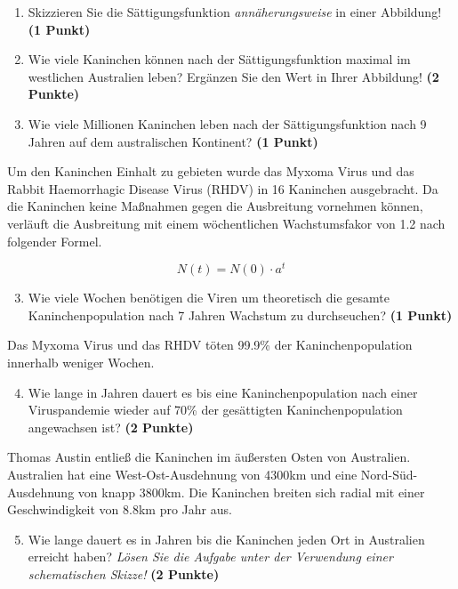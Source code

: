 \documentclass[a4paper, 9pt]{scrartcl}\usepackage[]{graphicx}\usepackage[]{xcolor}
\begin{document}
\begin{enumerate}
\item Skizzieren Sie die S{\"a}ttigungsfunktion \textit{ann{\"a}herungsweise} in einer Abbildung! \textbf{(1
    Punkt)}
\item Wie viele Kaninchen k{\"o}nnen nach der S{\"a}ttigungsfunktion maximal im
  westlichen Australien leben? Erg{\"a}nzen Sie den Wert in Ihrer Abbildung! \textbf{(2 Punkte)}
\item Wie viele Millionen Kaninchen leben nach der S{\"a}ttigungsfunktion
  nach 9 Jahren auf dem australischen Kontinent? \textbf{(1
    Punkt)}
\end{enumerate}

Um den Kaninchen Einhalt zu gebieten wurde das Myxoma Virus und das Rabbit
Haemorrhagic Disease Virus (RHDV) in 16 Kaninchen
ausgebracht. Da die Kaninchen keine Ma{\ss}nahmen gegen die Ausbreitung
vornehmen k{\"o}nnen, verl{\"a}uft die Ausbreitung mit einem w{\"o}chentlichen
Wachstumsfakor von 1.2 nach folgender Formel.

\begin{equation*}
  N(t) = N(0) \cdot a^t
\end{equation*}

\begin{enumerate}
  \setcounter{enumi}{2}
\item Wie viele Wochen ben{\"o}tigen die Viren um theoretisch die gesamte
  Kaninchenpopulation nach 7 Jahren Wachstum zu
  durchseuchen? \textbf{(1 Punkt)}
\end{enumerate}

Das Myxoma Virus und das RHDV t{\"o}ten 99.9\% der
Kaninchenpopulation innerhalb weniger Wochen.

\begin{enumerate}
  \setcounter{enumi}{3}  
\item Wie lange in Jahren dauert es bis eine Kaninchenpopulation nach einer
  Viruspandemie wieder auf 70\% der ges{\"a}ttigten
  Kaninchenpopulation angewachsen ist?  \textbf{(2 Punkte)}
\end{enumerate}

Thomas Austin entlie{\ss} die Kaninchen im {\"a}u{\ss}ersten Osten von
Australien. Australien hat eine West-Ost-Ausdehnung von 4300km
und eine Nord-S{\"u}d-Ausdehnung von knapp 3800km. Die Kaninchen
breiten sich radial mit einer Geschwindigkeit von 8.8km pro
Jahr aus.

\begin{enumerate}
  \setcounter{enumi}{4}
\item Wie lange dauert es in Jahren bis die Kaninchen jeden Ort
  in Australien erreicht haben? \textit{L{\"o}sen Sie die Aufgabe unter der
    Verwendung einer schematischen Skizze!} \textbf{(2 Punkte)}
\end{enumerate}
\end{document}
